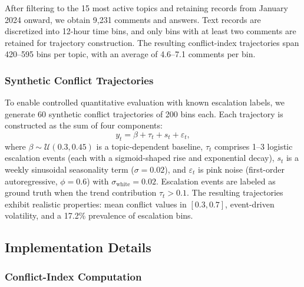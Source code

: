 \documentclass[journal]{IEEEtran}
\begin{document}
After filtering to the 15 most active topics and retaining records from January 2024 onward, we obtain 9,231 comments and answers. Text records are discretized into 12-hour time bins, and only bins with at least two comments are retained for trajectory construction. The resulting conflict-index trajectories span 420--595 bins per topic, with an average of 4.6--7.1 comments per bin.

\subsubsection{Synthetic Conflict Trajectories}

To enable controlled quantitative evaluation with known escalation labels, we generate 60 synthetic conflict trajectories of 200 bins each. Each trajectory is constructed as the sum of four components:
\begin{equation}
y_t = \beta + \tau_t + s_t + \varepsilon_t,
\label{eq:synthetic}
\end{equation}
where $\beta \sim \mathcal{U}(0.3, 0.45)$ is a topic-dependent baseline, $\tau_t$ comprises 1--3 logistic escalation events (each with a sigmoid-shaped rise and exponential decay), $s_t$ is a weekly sinusoidal seasonality term ($\sigma=0.02$), and $\varepsilon_t$ is pink noise (first-order autoregressive, $\phi=0.6$) with $\sigma_{\text{white}}=0.02$. Escalation events are labeled as ground truth when the trend contribution $\tau_t > 0.1$. The resulting trajectories exhibit realistic properties: mean conflict values in $[0.3, 0.7]$, event-driven volatility, and a 17.2\% prevalence of escalation bins.

\subsection{Implementation Details}
\label{sec:impl}

\subsubsection{Conflict-Index Computation}
\end{document}
